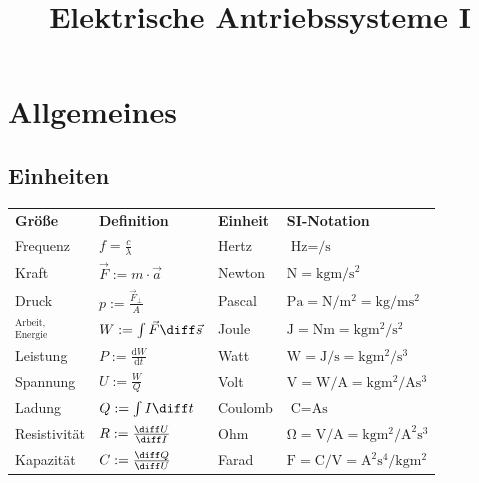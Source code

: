 \documentclass[fs, german]{latex4ei_fs}
\begin{document}
\title{Elektrische Antriebssysteme I} 

\section{Allgemeines}
\begin{sectionbox}
	\subsection{Einheiten}
	\begin{tabular}{llll} \ctrule
		\textbf{Größe} & \textbf{Definition} & \textbf{Einheit} & \textbf{SI-Notation} \\ \cmrule
		Frequenz & $f = \frac{c}{\lambda}$ & Hertz & $\si{\hertz} = \si{ \per \second}$\\
		Kraft & $ \vec F := m \cdot \vec a $ & Newton & $\si{\newton} = \si{\kilogram \meter \per \second \squared}$\\
		Druck & $p := \frac{\vec F_\perp}{A}$ & Pascal & $\si{\pascal} = \si{\newton \per \meter \squared} = \si{\kilogram \per \meter \second \squared}$\\
		${}^{\textstyle \text{Arbeit,}}_{\textstyle \text{Energie}}$ & $W := \int \vec F \diff \vec s$ & Joule & $\si{\joule} = \si{\newton\meter} = \si{\kilogram\meter \squared \per \second \squared}$ \\
		Leistung & $P := \frac{\mathrm dW}{\mathrm dt}$ & Watt & $\si{\watt} = \si{\joule \per \second} = \si{\kilogram\meter \squared \per \second \cubed}$\\
		Spannung & $U := \frac{W}{Q}$ & Volt & $\si{\volt} = \si{\watt \per \ampere} = \si{\kilogram\meter  \squared \per \ampere\second \cubed}$\\
		Ladung & $Q:= \int I \diff t$ & Coulomb & $\si{\coulomb} = \si{\ampere\second}$\\
		Resistivität & $R := \frac{\diff U}{\diff I}$ & Ohm & $\si{\ohm} = \si{\volt \per \ampere} = \si{\kilogram\meter  \squared \per \ampere  \squared\second \cubed}$\\
		Kapazität & $C:= \frac{\diff Q}{\diff U}$ & Farad & $\si{\farad} = \si{\coulomb \per \volt} = \si{\ampere  \squared  \second \tothe{4}\per \kilogram\meter \squared}$\\	

\end{tabular}
\end{sectionbox}
\end{document}
